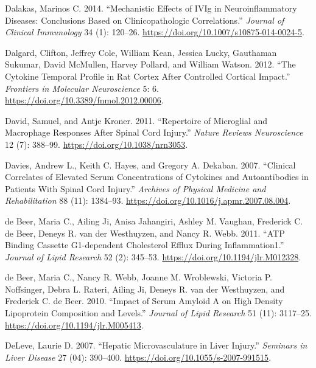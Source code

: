 \documentclass[9pt,lineno]{elife}
\newlength{\cslhangindent}
\newlength{\cslentryspacingunit} %
\newenvironment{CSLReferences}[2] %
 {%
  \setlength{\parindent}{0pt}
  \ifodd #1
  \let\oldpar\par
  \def\par{\hangindent=\cslhangindent\oldpar}
  \fi
  \setlength{\parskip}{#2\cslentryspacingunit}
 }%
 {}
\begin{document}
\begin{CSLReferences}{1}{0}
\leavevmode{}%
Dalakas, Marinos C. 2014. {``Mechanistic {Effects} of {IVIg} in {Neuroinflammatory Diseases}: {Conclusions Based} on {Clinicopathologic Correlations}.''} \emph{Journal of Clinical Immunology} 34 (1): 120--26. \url{https://doi.org/10.1007/s10875-014-0024-5}.

\leavevmode{}%
Dalgard, Clifton, Jeffrey Cole, William Kean, Jessica Lucky, Gauthaman Sukumar, David McMullen, Harvey Pollard, and William Watson. 2012. {``The Cytokine Temporal Profile in Rat Cortex After Controlled Cortical Impact.''} \emph{Frontiers in Molecular Neuroscience} 5: 6. \url{https://doi.org/10.3389/fnmol.2012.00006}.

\leavevmode{}%
David, Samuel, and Antje Kroner. 2011. {``Repertoire of Microglial and Macrophage Responses After Spinal Cord Injury.''} \emph{Nature Reviews Neuroscience} 12 (7): 388--99. \url{https://doi.org/10.1038/nrn3053}.

\leavevmode{}%
Davies, Andrew L., Keith C. Hayes, and Gregory A. Dekaban. 2007. {``Clinical {Correlates} of {Elevated Serum Concentrations} of {Cytokines} and {Autoantibodies} in {Patients With Spinal Cord Injury}.''} \emph{Archives of Physical Medicine and Rehabilitation} 88 (11): 1384--93. \url{https://doi.org/10.1016/j.apmr.2007.08.004}.

\leavevmode{}%
de Beer, Maria C., Ailing Ji, Anisa Jahangiri, Ashley M. Vaughan, Frederick C. de Beer, Deneys R. van der Westhuyzen, and Nancy R. Webb. 2011. {``{ATP} Binding Cassette {G1-dependent} Cholesterol Efflux During Inflammation1.''} \emph{Journal of Lipid Research} 52 (2): 345--53. \url{https://doi.org/10.1194/jlr.M012328}.

\leavevmode{}%
de Beer, Maria C., Nancy R. Webb, Joanne M. Wroblewski, Victoria P. Noffsinger, Debra L. Rateri, Ailing Ji, Deneys R. van der Westhuyzen, and Frederick C. de Beer. 2010. {``Impact of Serum Amyloid {A} on High Density Lipoprotein Composition and Levels.''} \emph{Journal of Lipid Research} 51 (11): 3117--25. \url{https://doi.org/10.1194/jlr.M005413}.

\leavevmode{}%
DeLeve, Laurie D. 2007. {``Hepatic {Microvasculature} in {Liver Injury}.''} \emph{Seminars in Liver Disease} 27 (04): 390--400. \url{https://doi.org/10.1055/s-2007-991515}.


\end{CSLReferences}
\end{document}

